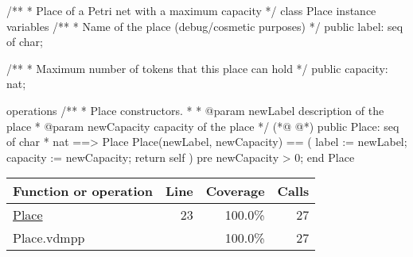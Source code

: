 \begin{vdmpp}
/**
 * Place of a Petri net with a maximum capacity
 */
class Place
  instance variables
    /**
     * Name of the place (debug/cosmetic purposes)
     */
    public label: seq of char;

    /**
     * Maximum number of tokens that this place can hold
     */
    public capacity: nat;

  operations
    /**
     * Place constructors.
     *
     * @param newLabel description of the place
     * @param newCapacity capacity of the place
     */
(*@
\label{Place:23}
@*)
    public Place: seq of char * nat ==> Place
    Place(newLabel, newCapacity) == (
      label := newLabel;
      capacity := newCapacity;
      return self
    )
    pre newCapacity > 0;
end Place
\end{vdmpp}
\bigskip
\begin{longtable}{|l|r|r|r|}
\hline
Function or operation & Line & Coverage & Calls \\
\hline
\hline
\hyperref[Place:23]{Place} & 23&100.0\% & 27 \\
\hline
\hline
Place.vdmpp & & 100.0\% & 27 \\
\hline
\end{longtable}